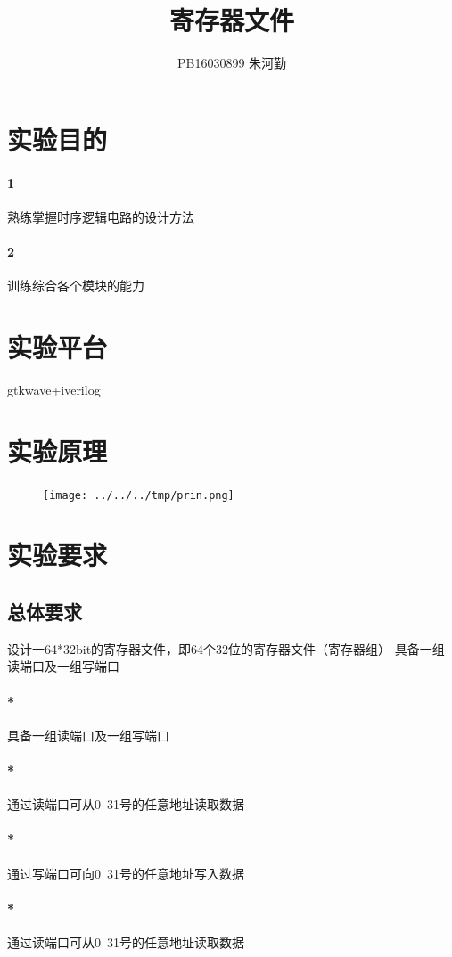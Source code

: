 \documentclass[UTF8]{ctexart}
\title{寄存器文件}
\author{PB16030899 朱河勤}
\begin{document}
\maketitle
\tableofcontents

\section{实验目的}

\paragraph{1}熟练掌握时序逻辑电路的设计方法
\paragraph{2}训练综合各个模块的能力


\section{实验平台}
gtkwave+iverilog


\section{实验原理}
\begin{figure}[H]
  \centering
  \texttt{[image: ../../../tmp/prin.png]}
\end{figure}


\section{实验要求}
\subsection{总体要求}
设计一64*32bit的寄存器文件，即64个32位的寄存器文件（寄存器组）
具备一组读端口及一组写端口
\paragraph{*}具备一组读端口及一组写端口
\paragraph{*}通过读端口可从0~31号的任意地址读取数据
\paragraph{*}通过写端口可向0~31号的任意地址写入数据
\paragraph{*}通过读端口可从0~31号的任意地址读取数据
\end{document}
